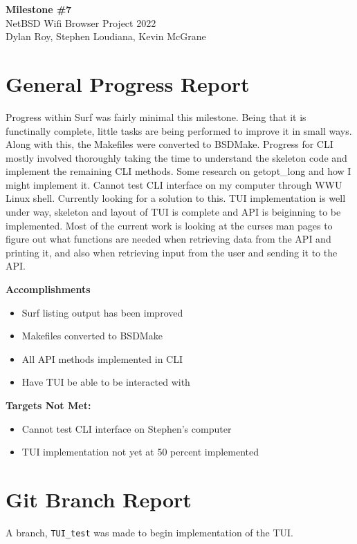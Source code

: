 \documentclass[11pt]{article}
\begin{document}
\begin{center}
  \textbf{\Large Milestone \#7}\\\large NetBSD Wifi Browser Project 2022\\
  Dylan Roy, Stephen Loudiana, Kevin McGrane
\end{center}

\section{General Progress Report}
Progress within Surf was fairly minimal this milestone. Being that it
is functinally complete, little tasks are being performed to improve
it in small ways. Along with this, the Makefiles were converted to BSDMake. 
Progress for CLI mostly involved thoroughly taking the time to understand 
the skeleton code and implement the remaining CLI methods. Some research on 
getopt_long and how I might implement it. Cannot test CLI interface on my 
computer through WWU Linux shell. Currently looking for a solution to this. 
TUI implementation is well under way, skeleton and layout of TUI is complete 
and API is beiginning to be implemented. Most of the current work is looking
at the curses man pages to figure out what functions are needed when retrieving 
data from the API and printing it, and also when retrieving input from the user
and sending it to the API.

\textbf{Accomplishments}
\begin{itemize}
  \item Surf listing output has been improved 
  \item Makefiles converted to BSDMake
  \item All API methods implemented in CLI 
  \item Have TUI be able to be interacted with
\end{itemize}

\textbf{Targets Not Met:}
\begin{itemize}
  \item Cannot test CLI interface on Stephen's computer 
  \item TUI implementation not yet at 50 percent implemented
\end{itemize}


\section{Git Branch Report}
A branch, \texttt{TUI\_test} was made to begin implementation of the TUI.
\end{document}
